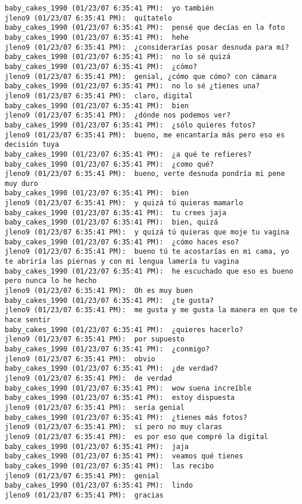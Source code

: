 \begin{verbatim}
baby_cakes_1990 (01/23/07 6:35:41 PM):  yo también
jleno9 (01/23/07 6:35:41 PM):  quítatelo
baby_cakes_1990 (01/23/07 6:35:41 PM):  pensé que decías en la foto
baby_cakes_1990 (01/23/07 6:35:41 PM):  hehe
jleno9 (01/23/07 6:35:41 PM):  ¿considerarías posar desnuda para mí?
baby_cakes_1990 (01/23/07 6:35:41 PM):  no lo sé quizá
baby_cakes_1990 (01/23/07 6:35:41 PM):  ¿cómo?
jleno9 (01/23/07 6:35:41 PM):  genial, ¿cómo que cómo? con cámara
baby_cakes_1990 (01/23/07 6:35:41 PM):  no lo sé ¿tienes una?
jleno9 (01/23/07 6:35:41 PM):  claro, digital
baby_cakes_1990 (01/23/07 6:35:41 PM):  bien
jleno9 (01/23/07 6:35:41 PM):  ¿dónde nos podemos ver?
baby_cakes_1990 (01/23/07 6:35:41 PM):  ¿sólo quieres fotos?
jleno9 (01/23/07 6:35:41 PM):  bueno, me encantaría más pero eso es decisión tuya
baby_cakes_1990 (01/23/07 6:35:41 PM):  ¿a qué te refieres?
baby_cakes_1990 (01/23/07 6:35:41 PM):  ¿como qué?
jleno9 (01/23/07 6:35:41 PM):  bueno, verte desnuda pondría mi pene muy duro
baby_cakes_1990 (01/23/07 6:35:41 PM):  bien
jleno9 (01/23/07 6:35:41 PM):  y quizá tú quieras mamarlo
baby_cakes_1990 (01/23/07 6:35:41 PM):  tu crees jaja
baby_cakes_1990 (01/23/07 6:35:41 PM):  bien, quizá
jleno9 (01/23/07 6:35:41 PM):  y quizá tú quieras que moje tu vagina
baby_cakes_1990 (01/23/07 6:35:41 PM):  ¿cómo haces eso?
jleno9 (01/23/07 6:35:41 PM):  bueno tú te acostarías en mi cama, yo te abriría las piernas y con mi lengua lamería tu vagina
baby_cakes_1990 (01/23/07 6:35:41 PM):  he escuchado que eso es bueno pero nunca lo he hecho
jleno9 (01/23/07 6:35:41 PM):  Oh es muy buen
baby_cakes_1990 (01/23/07 6:35:41 PM):  ¿te gusta?
jleno9 (01/23/07 6:35:41 PM):  me gusta y me gusta la manera en que te hace sentir
baby_cakes_1990 (01/23/07 6:35:41 PM):  ¿quieres hacerlo?
jleno9 (01/23/07 6:35:41 PM):  por supuesto
baby_cakes_1990 (01/23/07 6:35:41 PM):  ¿conmigo?
jleno9 (01/23/07 6:35:41 PM):  obvio
baby_cakes_1990 (01/23/07 6:35:41 PM):  ¿de verdad?
jleno9 (01/23/07 6:35:41 PM):  de verdad
baby_cakes_1990 (01/23/07 6:35:41 PM):  wow suena increíble
baby_cakes_1990 (01/23/07 6:35:41 PM):  estoy dispuesta
jleno9 (01/23/07 6:35:41 PM):  sería genial
baby_cakes_1990 (01/23/07 6:35:41 PM):  ¿tienes más fotos?
jleno9 (01/23/07 6:35:41 PM):  sí pero no muy claras
jleno9 (01/23/07 6:35:41 PM):  es por eso que compré la digital
baby_cakes_1990 (01/23/07 6:35:41 PM):  jaja
baby_cakes_1990 (01/23/07 6:35:41 PM):  veamos qué tienes
baby_cakes_1990 (01/23/07 6:35:41 PM):  las recibo
jleno9 (01/23/07 6:35:41 PM):  genial
baby_cakes_1990 (01/23/07 6:35:41 PM):  lindo 
jleno9 (01/23/07 6:35:41 PM):  gracias

\end{verbatim}
